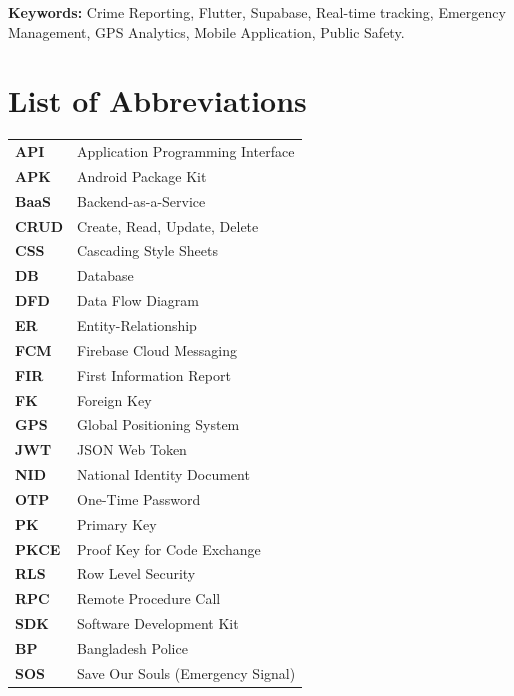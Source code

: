 \documentclass[12pt, a4paper, twoside, openany]{report}
\begin{document}
\vspace{0.5cm}
\noindent\textbf{Keywords:} Crime Reporting, Flutter, Supabase, Real-time tracking, Emergency Management, GPS Analytics, Mobile Application, Public Safety.
\tableofcontents
\clearpage
\listoffigures
{}
\listoftables
{}
\clearpage
\chapter*{List of Abbreviations}
\begin{table}[ht]
\begin{tabularx}{\textwidth}{lX}
\textbf{API} & Application Programming Interface \\
\textbf{APK} & Android Package Kit \\
\textbf{BaaS} & Backend-as-a-Service \\
\textbf{CRUD} & Create, Read, Update, Delete \\
\textbf{CSS} & Cascading Style Sheets \\
\textbf{DB} & Database \\
\textbf{DFD} & Data Flow Diagram \\
\textbf{ER} & Entity-Relationship \\
\textbf{FCM} & Firebase Cloud Messaging \\
\textbf{FIR} & First Information Report \\
\textbf{FK} & Foreign Key \\
\textbf{GPS} & Global Positioning System \\
\textbf{JWT} & JSON Web Token \\
\textbf{NID} & National Identity Document \\
\textbf{OTP} & One-Time Password \\
\textbf{PK} & Primary Key \\
\textbf{PKCE} & Proof Key for Code Exchange \\
\textbf{RLS} & Row Level Security \\
\textbf{RPC} & Remote Procedure Call \\
\textbf{SDK} & Software Development Kit \\
\textbf{BP} & Bangladesh Police \\
\textbf{SOS} & Save Our Souls (Emergency Signal) \\

\end{tabularx}
\end{table}
\end{document}
